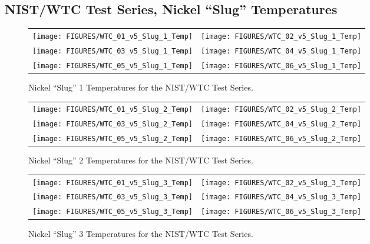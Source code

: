 \clearpage


\subsection{NIST/WTC Test Series, Nickel ``Slug'' Temperatures}

\vspace{1in}

\begin{figure}[h!]
\begin{tabular*}{\textwidth}{l@{\extracolsep{\fill}}r}
\texttt{[image: FIGURES/WTC\_01\_v5\_Slug\_1\_Temp]} &
\texttt{[image: FIGURES/WTC\_02\_v5\_Slug\_1\_Temp]} \\
\texttt{[image: FIGURES/WTC\_03\_v5\_Slug\_1\_Temp]} &
\texttt{[image: FIGURES/WTC\_04\_v5\_Slug\_1\_Temp]} \\
\texttt{[image: FIGURES/WTC\_05\_v5\_Slug\_1\_Temp]} &
\texttt{[image: FIGURES/WTC\_06\_v5\_Slug\_1\_Temp]}
\end{tabular*}
\caption{Nickel ``Slug'' 1 Temperatures for the NIST/WTC Test Series.}
\label{NIST_WTC Slug_1}
\end{figure}

\begin{figure}[h!]
\begin{tabular*}{\textwidth}{l@{\extracolsep{\fill}}r}
\texttt{[image: FIGURES/WTC\_01\_v5\_Slug\_2\_Temp]} &
\texttt{[image: FIGURES/WTC\_02\_v5\_Slug\_2\_Temp]} \\
\texttt{[image: FIGURES/WTC\_03\_v5\_Slug\_2\_Temp]} &
\texttt{[image: FIGURES/WTC\_04\_v5\_Slug\_2\_Temp]} \\
\texttt{[image: FIGURES/WTC\_05\_v5\_Slug\_2\_Temp]} &
\texttt{[image: FIGURES/WTC\_06\_v5\_Slug\_2\_Temp]}
\end{tabular*}
\caption{Nickel ``Slug'' 2 Temperatures for the NIST/WTC Test Series.}
\label{NIST_WTC Slug_2}
\end{figure}

\begin{figure}[h!]
\begin{tabular*}{\textwidth}{l@{\extracolsep{\fill}}r}
\texttt{[image: FIGURES/WTC\_01\_v5\_Slug\_3\_Temp]} &
\texttt{[image: FIGURES/WTC\_02\_v5\_Slug\_3\_Temp]} \\
\texttt{[image: FIGURES/WTC\_03\_v5\_Slug\_3\_Temp]} &
\texttt{[image: FIGURES/WTC\_04\_v5\_Slug\_3\_Temp]} \\
\texttt{[image: FIGURES/WTC\_05\_v5\_Slug\_3\_Temp]} &
\texttt{[image: FIGURES/WTC\_06\_v5\_Slug\_3\_Temp]}
\end{tabular*}
\caption{Nickel ``Slug'' 3 Temperatures for the NIST/WTC Test Series.}
\label{NIST_WTC Slug_3}
\end{figure}


